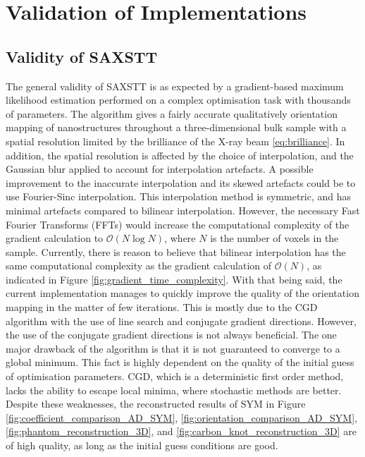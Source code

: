 \chapter{Validation of Implementations} \label{ch:validation_discussion}

\section{Validity of SAXSTT}
\label{sec:validity_saxstt}
The general validity of SAXSTT is as expected by a gradient-based maximum likelihood estimation performed on a complex optimisation task with thousands of parameters.
The algorithm gives a fairly accurate qualitatively orientation mapping of nanostructures
throughout a three-dimensional bulk sample with a spatial resolution limited by the brilliance of the X-ray beam \eqref{eq:brilliance}.
In addition, the spatial resolution is affected by the choice of interpolation, and the Gaussian blur applied to account for interpolation artefacts.
A possible improvement to the inaccurate interpolation and its skewed artefacts could be to use Fourier-Sinc interpolation. %
This interpolation method is symmetric, and has minimal artefacts compared to bilinear interpolation.
However, the necessary Fast Fourier Transforms (FFTs) would increase the computational complexity of the gradient calculation to $\mathcal{O}(N\log{}N)$,
where $N$ is the number of voxels in the sample. %
Currently, there is reason to believe that bilinear interpolation has the same computational complexity as the gradient calculation of $\mathcal{O}(N)$, as indicated in Figure \ref{fig:gradient_time_complexity}.
With that being said, the current implementation manages to quickly improve the quality of the orientation mapping in the matter of few iterations.
This is mostly due to the CGD algorithm with the use of line search and conjugate gradient directions.
However, the use of the conjugate gradient directions is not always beneficial.
The one major drawback of the algorithm is that it is not guaranteed to converge to a global minimum.
This fact is highly dependent on the quality of the initial guess of optimisation parameters.
CGD, which is a deterministic first order method, lacks the ability to escape local minima,
where stochastic methods are better. %
Despite these weaknesses,
the reconstructed results of SYM in
Figure \ref{fig:coefficient_comparison_AD_SYM},
\ref{fig:orientation_comparison_AD_SYM},
\ref{fig:phantom_reconstruction_3D}, and
\ref{fig:carbon_knot_reconstruction_3D} are of high quality, as long as the initial guess conditions are good.

